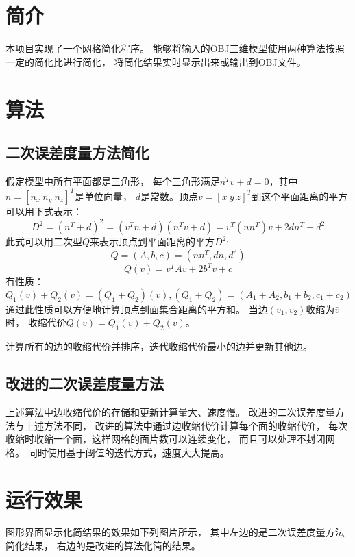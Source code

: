 
\maketitle

\section{简介}
本项目实现了一个网格简化程序。%
能够将输入的OBJ三维模型使用两种算法按照一定的简化比进行简化，%
将简化结果实时显示出来或输出到OBJ文件。%

\section{算法}
\subsection{二次误差度量方法简化}
假定模型中所有平面都是三角形，%
每个三角形满足$n^Tv+d=0$，其中$n=[n_x\ n_y\ n_z]^T$是单位向量，%
$d$是常数。顶点$v=[x\ y\ z]^T$到这个平面距离的平方可以用下式表示：%
\begin{equation}
D^2=(n^T+d)^2=(v^Tn+d)(n^Tv+d)=v^T(nn^T)v+2dn^T+d^2
\end{equation}
此式可以用二次型$Q$来表示顶点到平面距离的平方$D^2$:%
\begin{equation}
Q=(A,b,c)=(nn^T,dn,d^2)
\end{equation}
\begin{equation}
Q(v)=v^TAv+2b^Tv+c
\end{equation}
有性质：
\begin{equation}
Q_1(v)+Q_2(v)=(Q_1+Q_2)(v),(Q_1+Q_2)=(A_1+A_2,b_1+b_2,c_1+c_2)
\end{equation}
通过此性质可以方便地计算顶点到面集合距离的平方和。%
当边$(v_1,v_2)$收缩为$\bar{v}$时，%
收缩代价$Q(\bar{v})=Q_1(\bar{v})+Q_2(\bar{v})$。

计算所有的边的收缩代价并排序，迭代收缩代价最小的边并更新其他边。%

\subsection{改进的二次误差度量方法}
上述算法中边收缩代价的存储和更新计算量大、速度慢。%
改进的二次误差度量方法与上述方法不同，%
改进的算法中通过边收缩代价计算每个面的收缩代价，%
每次收缩时收缩一个面，这样网格的面片数可以连续变化，%
而且可以处理不封闭网格。%
同时使用基于阈值的迭代方式，速度大大提高。%

\section{运行效果}
图形界面显示化简结果的效果如下列图片所示，%
其中左边的是二次误差度量方法简化结果，%
右边的是改进的算法化简的结果。

